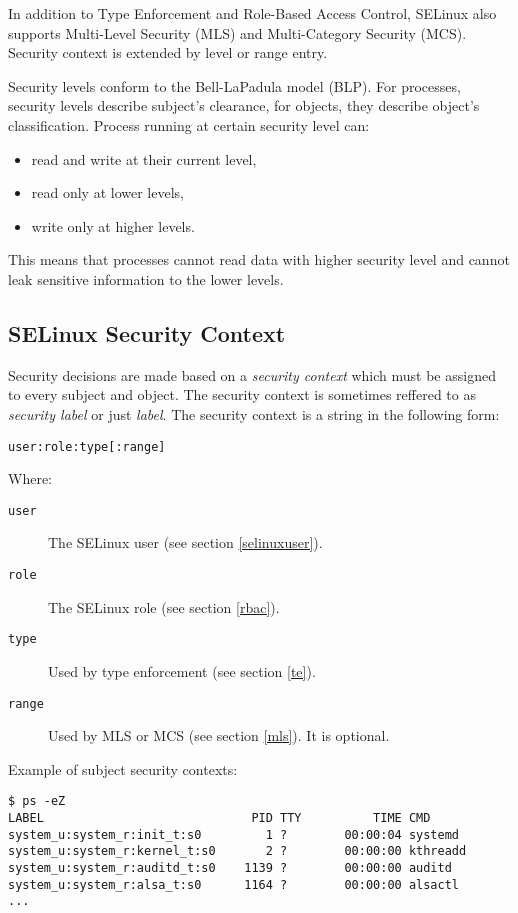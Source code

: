 In addition to Type Enforcement and Role-Based Access Control, SELinux also
supports Multi-Level Security (MLS) and Multi-Category Security (MCS). Security
context is extended by level or range entry.

Security levels conform to the Bell-LaPadula model (BLP). For processes,
security levels describe subject's clearance, for objects, they describe
object's classification. Process running at certain security level can:
\begin{itemize}
    \item read and write at their current level,
    \item read only at lower levels,
    \item write only at higher levels.
\end{itemize}
This means that processes cannot read data with higher security level and cannot
leak sensitive information to the lower levels.

\subsection{SELinux Security Context}

Security decisions are made based on a \emph{security context} which must be
assigned to every subject and object. The security context is sometimes reffered
to as \emph{security label} or just \emph{label}. The security context is a
string in the following form:
\begin{lstlisting}
user:role:type[:range]
\end{lstlisting}
Where:
\begin{description}
    \item [\texttt{user}] The SELinux user (see section \ref{selinuxuser}).
    \item [\texttt{role}] The SELinux role (see section \ref{rbac}).
    \item [\texttt{type}] Used by type enforcement (see section \ref{te}).
    \item [\texttt{range}] Used by MLS or MCS (see section \ref{mls}). It is optional.
\end{description}

Example of subject security contexts:
\begin{lstlisting}
$ ps -eZ
LABEL                             PID TTY          TIME CMD
system_u:system_r:init_t:s0         1 ?        00:00:04 systemd
system_u:system_r:kernel_t:s0       2 ?        00:00:00 kthreadd
system_u:system_r:auditd_t:s0    1139 ?        00:00:00 auditd
system_u:system_r:alsa_t:s0      1164 ?        00:00:00 alsactl
...
\end{lstlisting}


